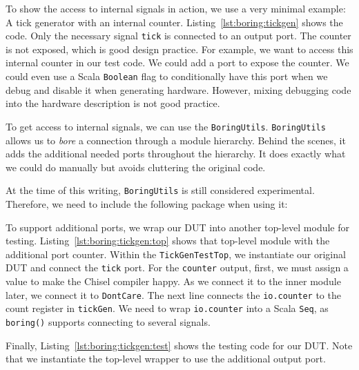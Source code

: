 \documentclass[%
    10pt,
    headinclude, footexclude,
    openright, %
    notitlepage,
    cleardoubleempty,
    headsepline,
    pointlessnumbers,
    bibtotoc, idxtotoc,
    ]{scrbook}
\newcommand{\code}[1]{{\lstinline[basicstyle=\small\ttfamily]{#1}}}
\newcommand{\todo}[1]{{\emph{TODO: #1}}}
\renewcommand{\todo}[1]{}
\begin{document}
\todo{Explain and explore the co-simulation in the Leros chapter.}



To show the access to internal signals in action, we use a very minimal example:
A tick generator with an internal counter. Listing~\ref{lst:boring:tickgen} shows the code.
Only the necessary signal \code{tick} is connected to an output port.
The counter is not exposed, which is good design practice.
For example, we want to access this internal counter in our test code.
We could add a port to expose the counter. We could even use a Scala \code{Boolean}
flag to conditionally have this port when we debug and disable it
when generating hardware.
However, mixing debugging code into the hardware description is not good practice.


To get access to internal signals, we can use the \code{BoringUtils}. 
\code{BoringUtils} allows us to \emph{bore} a connection through a module hierarchy.
Behind the scenes, it adds the additional needed ports throughout the hierarchy.
It does exactly what we could do manually but avoids cluttering the original code.

At the time of this writing, \code{BoringUtils} is still considered experimental.
Therefore, we need to include the following package when using it:



To support additional ports, we wrap our DUT into another top-level module for testing.
Listing~\ref{lst:boring:tickgen:top} shows that top-level module with the additional port
counter. Within the \code{TickGenTestTop}, we instantiate our original DUT and connect
the \code{tick} port. For the \code{counter} output, first, we must assign a value to
make the Chisel compiler happy. As we connect it to the inner module later,
we connect it to \code{DontCare}.
The next line connects the \code{io.counter} to the count register in \code{tickGen}.
We need to wrap \code{io.counter} into a Scala \code{Seq}, as \code{boring()} supports
connecting to several signals.


Finally, Listing~\ref{lst:boring:tickgen:test} shows the testing code for our DUT.
Note that we instantiate the top-level wrapper to use the additional output port.
\end{document}
